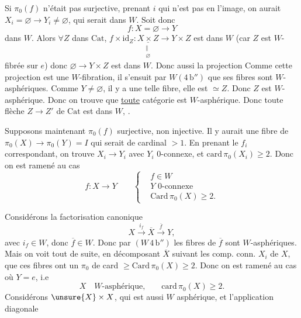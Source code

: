Si $\pi_0(f)$ n'était pas surjective, prenant $i$ qui n'est pas en l'image, on aurait $X_i=\varnothing\longrightarrow Y_i\ne\varnothing$, qui serait dans $W$. Soit donc \[f:X=\varnothing\longrightarrow Y\] dans $W$. Alors $\forall Z$ dans $\mathrm{Cat}$, $f\times\mathrm{id}_Z:\underset{\substack{\Vert\\\varnothing}}{\underline{X\times Z}}\longrightarrow Y\times Z$ est dans $W$ (car $Z$ est $W$-fibrée sur $e$) donc $\varnothing\longrightarrow Y\times Z$ est dans $W$. Donc aussi la projection  Comme cette projection est une $W$-fibration, il s'ensuit  par $W(4\,\mathrm b'')$ que ses fibres sont $W$-asphériques. Comme $Y\ne\varnothing$, il y a une telle fibre, elle est $\simeq Z$. Donc $Z$ est $W$-asphérique.  Donc on trouve que \uline{toute} catégorie  est $W$-asphérique. Donc toute flèche $Z\longrightarrow Z'$ de $\mathrm{Cat}$ est dans $W$, .

Supposons maintenant $\pi_0(f)$ surjective,  non injective. Il y aurait une fibre de $\pi_0(X)\longrightarrow\pi_0(Y)=I$ qui serait de cardinal $>1$. En prenant le $f_i$ correspondant, on trouve $X_i\longrightarrow Y_i$ avec $Y_i$ 0-connexe, et $\mathrm{card}\,\pi_0(X_i)\geq2$.  Donc on est ramené au cas \[f:X\longrightarrow Y\qquad\left\{\begin{aligned}&f\in W\\&Y\text{ 0-connexe}\\&\mathrm{Card}\,\pi_0(X)\geq2.\end{aligned}\right.\]

Considérons la factorisation canonique \[X\xrightarrow{i_f}\overline X\xrightarrow{\overline f}Y,\] avec $i_f\in W$, donc $\overline f\in W$. Donc par $(W\,4\,\mathrm b'')$ les fibres de $\overline f$ sont $W$-asphériques. Mais on voit tout de suite,  en décomposant $\overline X$ suivant les comp. conn. $X_i$ de $X$, que ces fibres ont un $\pi_0$ de card $\geq\mathrm{Card}\,\pi_0(X)\geq2$. Donc on est ramené au cas où $Y=e$, i.e \[X\quad W\text{-asphérique,}\qquad \mathrm{card}\,\pi_0(X)\geq2.\] Considérons $\unsure{X}\times X$, qui est aussi $W$ asphérique, et l'application diagonale


